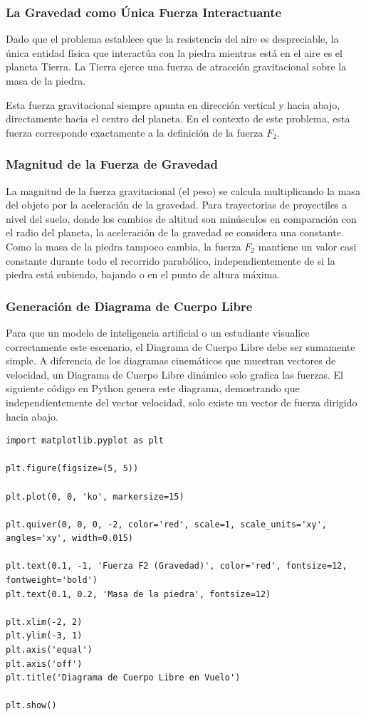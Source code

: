 \documentclass[12pt, a4paper]{article}
\begin{document}
\subsubsection*{La Gravedad como Única Fuerza Interactuante}

Dado que el problema establece que la resistencia del aire es despreciable, la única entidad física que interactúa con la piedra mientras está en el aire es el planeta Tierra. La Tierra ejerce una fuerza de atracción gravitacional sobre la masa de la piedra. 

Esta fuerza gravitacional siempre apunta en dirección vertical y hacia abajo, directamente hacia el centro del planeta. En el contexto de este problema, esta fuerza corresponde exactamente a la definición de la fuerza $F_2$.

\subsubsection*{Magnitud de la Fuerza de Gravedad}

La magnitud de la fuerza gravitacional (el peso) se calcula multiplicando la masa del objeto por la aceleración de la gravedad. Para trayectorias de proyectiles a nivel del suelo, donde los cambios de altitud son minúsculos en comparación con el radio del planeta, la aceleración de la gravedad se considera una constante. Como la masa de la piedra tampoco cambia, la fuerza $F_2$ mantiene un valor casi constante durante todo el recorrido parabólico, independientemente de si la piedra está subiendo, bajando o en el punto de altura máxima.

\subsubsection*{Generación de Diagrama de Cuerpo Libre}

Para que un modelo de inteligencia artificial o un estudiante visualice correctamente este escenario, el Diagrama de Cuerpo Libre debe ser sumamente simple. A diferencia de los diagramas cinemáticos que muestran vectores de velocidad, un Diagrama de Cuerpo Libre dinámico solo grafica las fuerzas. El siguiente código en Python genera este diagrama, demostrando que independientemente del vector velocidad, solo existe un vector de fuerza dirigido hacia abajo.

\begin{lstlisting}
import matplotlib.pyplot as plt

plt.figure(figsize=(5, 5))

plt.plot(0, 0, 'ko', markersize=15)

plt.quiver(0, 0, 0, -2, color='red', scale=1, scale_units='xy', angles='xy', width=0.015)

plt.text(0.1, -1, 'Fuerza F2 (Gravedad)', color='red', fontsize=12, fontweight='bold')
plt.text(0.1, 0.2, 'Masa de la piedra', fontsize=12)

plt.xlim(-2, 2)
plt.ylim(-3, 1)
plt.axis('equal')
plt.axis('off')
plt.title('Diagrama de Cuerpo Libre en Vuelo')

plt.show()
\end{lstlisting}
\end{document}
